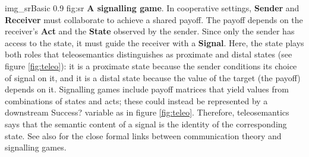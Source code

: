 \begin{myfig}
    {img_srBasic} %
    {0.9} %
    {fig:sr} %
    {\textbf{A signalling game}.
    In cooperative settings, \textbf{Sender} and \textbf{Receiver} must collaborate to achieve a shared payoff.
    The payoff depends on the receiver's \textbf{Act} and the \textbf{State} observed by the sender.
    Since only the sender has access to the state, it must guide the receiver with a \textbf{Signal}.
    Here, the state plays both roles that teleosemantics distinguishes as proximate and distal states (see figure \ref{fig:teleo}): it is a proximate state because the sender conditions its choice of signal on it, and it is a distal state because the value of the target (the payoff) depends on it.
    Signalling games include payoff matrices that yield values from combinations of states and acts; these could instead be represented by a downstream Success? variable as in figure \ref{fig:teleo}.
    Therefore, teleosemantics says that the semantic content of a signal is the identity of the corresponding state.
    See also \citet{martinez2019deception} for the close formal links between communication theory and signalling games.
    } %
\end{myfig}
